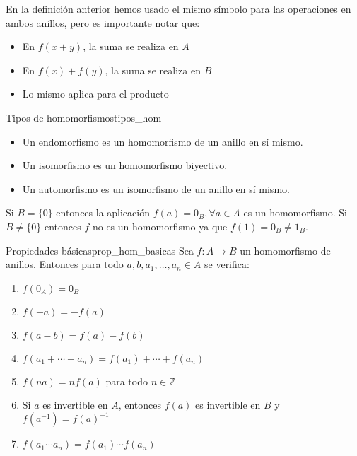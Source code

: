 \begin{remark}
    En la definición anterior hemos usado el mismo símbolo para las operaciones en ambos anillos, pero es importante notar que:
    \begin{itemize}
        \item En \(f(x + y)\), la suma se realiza en \(A\)
        \item En \(f(x) + f(y)\), la suma se realiza en \(B\)
        \item Lo mismo aplica para el producto
    \end{itemize}
\end{remark}

\begin{definition}{Tipos de homomorfismos}{tipos_hom}
    \begin{itemize}
        \item Un {endomorfismo} es un homomorfismo de un anillo en sí mismo.
        \item Un {isomorfismo} es un homomorfismo biyectivo.
        \item Un {automorfismo} es un isomorfismo de un anillo en sí mismo.
    \end{itemize}
\end{definition}

\begin{example}{}{}
    Si $B = \{0\}$ entonces la aplicación $f(a) = 0_B, \forall a \in A$ es un homomorfismo. Si $B \neq \{0\}$ entonces $f$ no es un homomorfismo ya que $f(1) = 0_B \neq 1_B$.
\end{example}

\begin{proposition}{Propiedades básicas}{prop_hom_basicas}
    Sea \(f: A \to B\) un homomorfismo de anillos. Entonces para todo \(a, b, a_1, \ldots, a_n \in A\) se verifica:
    \begin{enumerate}
        \item \(f(0_A) = 0_B\)
        \item \(f(-a) = -f(a)\)
        \item \(f(a - b) = f(a) - f(b)\)
        \item \(f(a_1 + \cdots + a_n) = f(a_1) + \cdots + f(a_n)\)
        \item \(f(na) = nf(a)\) para todo \(n \in \mathbb{Z}\)
        \item Si \(a\) es invertible en \(A\), entonces \(f(a)\) es invertible en \(B\) y \(f(a^{-1}) = f(a)^{-1}\)
        \item \(f(a_1 \cdots a_n) = f(a_1) \cdots f(a_n)\)
    \end{enumerate}
\end{proposition}


